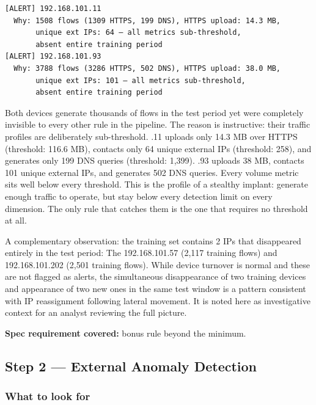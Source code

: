 \documentclass[
  11pt,
]{article}
\begin{document}
\begin{verbatim}
[ALERT] 192.168.101.11
  Why: 1508 flows (1309 HTTPS, 199 DNS), HTTPS upload: 14.3 MB,
       unique ext IPs: 64 — all metrics sub-threshold,
       absent entire training period
[ALERT] 192.168.101.93
  Why: 3788 flows (3286 HTTPS, 502 DNS), HTTPS upload: 38.0 MB,
       unique ext IPs: 101 — all metrics sub-threshold,
       absent entire training period
\end{verbatim}

Both devices generate thousands of flows in the test period yet were
completely invisible to every other rule in the pipeline. The reason is
instructive: their traffic profiles are deliberately sub-threshold. .11
uploads only 14.3 MB over HTTPS (threshold: 116.6 MB), contacts only 64
unique external IPs (threshold: 258), and generates only 199 DNS queries
(threshold: 1,399). .93 uploads 38 MB, contacts 101 unique external IPs,
and generates 502 DNS queries. Every volume metric sits well below every
threshold. This is the profile of a stealthy implant: generate enough
traffic to operate, but stay below every detection limit on every
dimension. The only rule that catches them is the one that requires no
threshold at all.

A complementary observation: the training set contains 2 IPs that
disappeared entirely in the test period: The 192.168.101.57 (2,117
training flows) and 192.168.101.202 (2,501 training flows). While device
turnover is normal and these are not flagged as alerts, the simultaneous
disappearance of two training devices and appearance of two new ones in
the same test window is a pattern consistent with IP reassignment
following lateral movement. It is noted here as investigative context
for an analyst reviewing the full picture.

\medskip
\noindent\colorbox{gray!12}{\parbox{\dimexpr\linewidth-2\fboxsep\relax}{\textbf{Spec requirement covered:} bonus rule beyond the minimum.}}

\hypertarget{external-anomaly-detection}{%
\subsection{Step 2 — External Anomaly Detection}\label{external-anomaly-detection}}

\hypertarget{what-to-look-for-1}{%
\subsubsection{What to look for}\label{what-to-look-for-1}}
\end{document}
